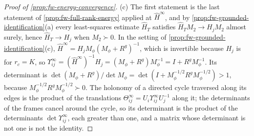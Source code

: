 \begin{proof}[Proof of \cref{prop:fw-energy-convergence}]
(c) The first statement is the last statement of \cref{prop:fw-full-rank-energy} applied at $\hat H^\infty$, and by \cref{prop:fw-grounded-identification}(a) every least-squares estimate $\hat H_T$ satisfies $\hat H_TM_2\to H_jM_2$ almost surely, hence $\hat H_T\to H_j$ when $M_2\succ0$. In the setting of \cref{prop:fw-grounded-identification}(c), $\hat H^\infty=H_jM_\phi(M_\phi+R^g)^{-1}$, which is invertible because $H_j$ is for $r_c=K$, so $\Upsilon^\infty_{ij}=(\hat H^\infty)^{-1}H_j=(M_\phi+R^g)M_\phi^{-1}=I+R^gM_\phi^{-1}$. Its determinant is $\det(M_\phi+R^g)/\det M_\phi=\det(I+M_\phi^{-1/2}R^gM_\phi^{-1/2})>1$, because $M_\phi^{-1/2}R^gM_\phi^{-1/2}\succ0$. The holonomy of a directed cycle traversed along its edges is the product of the translations $\Theta^\infty_{ij}=U_i\Upsilon^\infty_{ij}U_j^{-1}$ along it; the determinants of the frames cancel around the cycle, so its determinant is the product of the determinants $\det\Upsilon^\infty_{ij}$, each greater than one, and a matrix whose determinant is not one is not the identity.
\end{proof}

